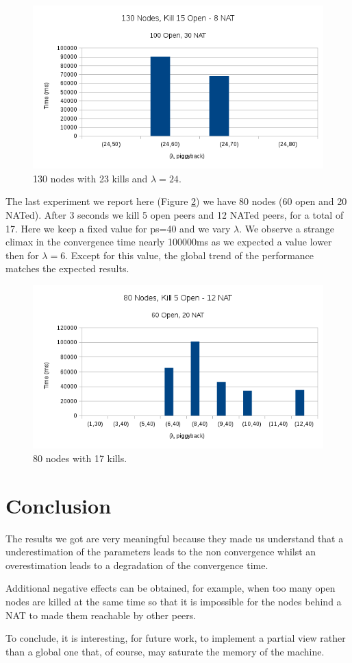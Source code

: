 \documentclass[10pt,a4paper]{proc}
\begin{document}
\begin{figure}
\centering
\includegraphics[scale=0.5]{metrics/kill15OpenFixedLamda.png}
\caption{130 nodes with 23 kills and $\lambda=24$.}
\label{kill15OpenFixed}
\end{figure}

The last experiment we report here (Figure \ref{kill5Open}) we have 80 nodes (60 open and 20 NATed). After 3 seconds we kill 5 open peers and 12 NATed peers, for a total of 17. Here we keep a fixed value for ps=40 and we vary $\lambda$. We observe a strange climax in the convergence time nearly 100000ms as we expected a value lower then for $\lambda=6$. Except for this value, the global trend of the performance matches the expected results.

\begin{figure}
\centering
\includegraphics[scale=0.5]{metrics/kill5Open.png}
\caption{80 nodes with 17 kills.}
\label{kill5Open}
\end{figure}

\section{Conclusion}

The results we got are very meaningful because they made us understand that a underestimation of the parameters leads to the non convergence whilst an overestimation leads to a degradation of the convergence time.

Additional negative effects can be obtained, for example, when too many open nodes are killed at the same time so that it is impossible for the nodes behind a NAT to made them reachable by other peers.

To conclude, it is interesting, for future work, to implement a partial view rather than a global one that, of course, may saturate the memory of the machine.
\end{document}
